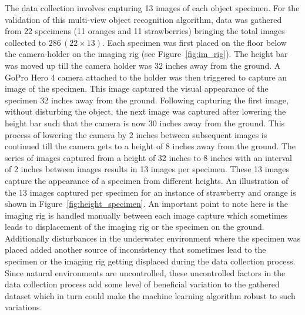 \documentclass {udthesis}
\begin{document}
The data collection involves capturing 13 images of each object specimen. For the validation of this multi-view object recognition algorithm, data was gathered from 22 specimens (11 oranges and 11 strawberries) bringing the total images collected to $286\, (22 \times 13)$. Each specimen was first placed on the floor below the camera-holder on the imaging rig (see Figure~\ref{fig:im_rig}). The height bar was moved up till the camera holder was $32$ inches away from the ground. A GoPro Hero 4 camera attached to the holder was then triggered to capture an image of the specimen. This image captured the visual appearance of the specimen 32 inches away from the ground. Following capturing the first image, without disturbing the object, the next image was captured after lowering the height bar such that the camera is now $30$ inches away from the ground.
This process of lowering the camera by 2 inches between subsequent images is continued till the camera gets to a height of $8$ inches away from the ground. 
The series of images captured from a height of 32 inches to 8 inches with an interval of 2 inches between images results in 13 images per specimen. 
These 13 images capture the appearance of a specimen from different heights. An illustration of the 13 images captured per specimen for an instance of strawberry and orange is shown in Figure~\ref{fig:height_specimen}. An important point to note here is the imaging rig is handled manually between each image capture which sometimes leads to displacement of the imaging rig or the specimen on the ground. 
Additionally disturbances in the underwater environment where the specimen was placed added another source of inconsistency that sometimes lead to the specimen or the imaging rig getting displaced during the data collection process. 
Since natural environments are uncontrolled, these uncontrolled factors in the data collection process add some level of beneficial variation to the gathered dataset which in turn could make the machine learning algorithm robust to such variations.
\end{document}
